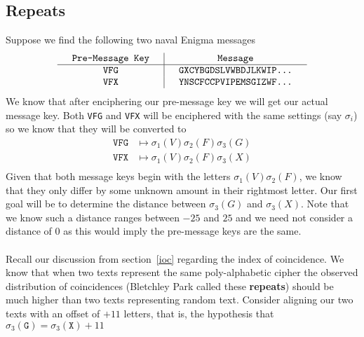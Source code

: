 \subsection{Repeats}
Suppose we find the following two naval Enigma messages
\[
	\setlength{\arraycolsep}{15pt}
	\begin{array}{c | c}
		\texttt{Pre-Message Key} & \texttt{Message}                \\
		\hline
		\texttt{VFG}             & \texttt{GXCYBGDSLVWBDJLKWIP...} \\
		\texttt{VFX}             & \texttt{YNSCFCCPVIPEMSGIZWF...} \\
	\end{array}
\]
We know that after enciphering our pre-message key we will get our
actual message key. Both \texttt{VFG} and \texttt{VFX} will be
enciphered with the same settings (say $\sigma_i$) so we know that
they will be converted to
\begin{align*}
	\texttt{VFG} & \mapsto \sigma_1(V)\sigma_2(F)\sigma_3(G) \\
	\texttt{VFX} & \mapsto \sigma_1(V)\sigma_2(F)\sigma_3(X) \\
\end{align*}
Given that both message keys begin with the letters
$\sigma_1(V)\sigma_2(F)$, we know that they only differ by some
unknown amount in their rightmost letter. Our first goal will be to
determine the distance between $\sigma_3(G)$ and $\sigma_3(X)$.
Note that we know such a distance ranges between $-25$ and $25$ and
we need not consider a distance of $0$ as this would imply the
pre-message keys are the same.
\\\\Recall our discussion from section~\ref{ioc} regarding the
index of coincidence. We know that when two texts represent the
same poly-alphabetic cipher the observed distribution of coincidences
(Bletchley Park called these {\bf{repeats}}) should be much higher
than two texts representing random text. Consider aligning our two
texts with an offset of $+11$ letters, that is, the hypothesis that
$\sigma_3(\texttt{G}) = \sigma_3(\texttt{X}) + 11$
\begin{center}
\end{center}
